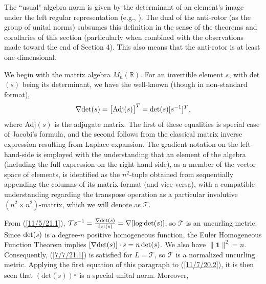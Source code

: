 \documentclass{amsart}
\numberwithin{equation}{section}
\theoremstyle{definition}
\numberwithin{theorem}{section}
\begin{document}
The ``usual" algebra norm is given by the determinant of an element's image under the left regular representation (e.g., \cite{bourbaki:1989}).  The dual of the anti-rotor (as the group of unital norms) subsumes this definition in the sense of the theorems and corollaries of this section (particularly when combined with the observations made toward the end of Section 4).  This also means that the anti-rotor is at least one-dimensional.

 We begin with the matrix algebra $ M_n(\mathbb{R})$. For an invertible element $s$, with det$(s)$ being its determinant, we have the well-known (though in non-standard format),
  \begin{equation}\label{11/5/21.1} \nabla \mbox{det}(s) = \big[{\rm Adj}(s)\big]^T = \mbox{det}(s)[s^{-1}]^T,\end{equation} where Adj$(s)$ is the adjugate matrix.  The first of these equalities is special case of Jacobi's formula, and the second follows from the classical matrix inverse expression resulting from Laplace expansion.  The gradient notation on the left-hand-side is employed with the understanding that an element of the algebra (including the full expression on the right-hand-side), as a member of the vector space of elements, is identified as the $n^2$-tuple obtained from sequentially appending the columns of its matrix format (and vice-versa), with a compatible understanding  regarding the transpose operation as a particular involutive $(n^2\times n^2)$-matrix, which we will denote as $\mathcal{T}$. 
  
From (\ref{11/5/21.1}), $\mathcal{T}s^{-1} = \frac{\nabla{\rm det}(s)}{{\rm det}(s)} = \nabla[\log{\rm det}(s)]$, so $\mathcal{T}$ is an uncurling metric.  Since ${\rm det}(s)$ is a degree-$n$ positive homogeneous function, the Euler Homogeneous Function Theorem implies $[\nabla{\rm det}(s)]\cdot s = n \,{\rm det}(s)$.  We also have $\|\mathbf{1}\|^2 = n$.  Consequently, (\ref{7/7/21.1}) is satisfied for $L=\mathcal{T}$, so $\mathcal{T}$ is a normalized uncurling metric.   Applying the first equation of this paragraph to (\ref{11/7/20.2}), it is then seen that $(\text{det}(s))^{\frac{1}{n}}$ is a special unital norm.
  Moreover,
 
\end{document}
